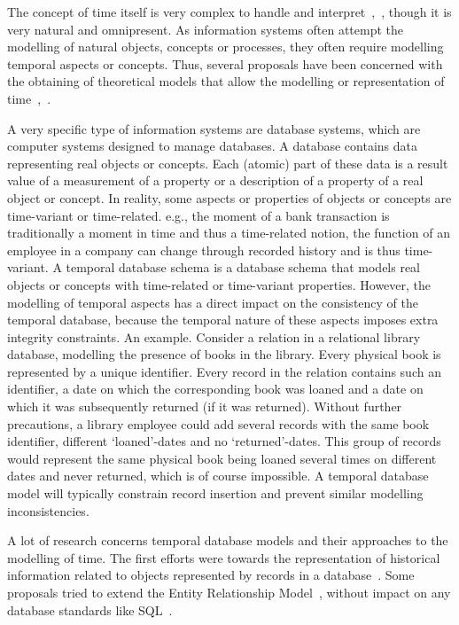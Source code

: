 %
%

The concept of time itself is very complex to handle and interpret~\cite{klein94},~\cite{Shackle61}, though it is very natural and omnipresent. As information systems often attempt the modelling of natural objects, concepts or processes, they often require modelling temporal aspects or concepts. Thus, several proposals have been concerned with the obtaining of theoretical models that allow the modelling or representation of time~\cite{Bolour82},~\cite{Cru97}.

A very specific type of information systems are database systems, which are computer systems designed to manage databases. A database contains data representing real objects or concepts. Each (atomic) part of these data is a result value of a measurement of a property or a description of a property of a real object or concept. In reality, some aspects or properties of objects or concepts are time-variant or time-related. e.g., the moment of a bank transaction is traditionally a moment in time and thus a time-related notion, the function of an employee in a company can change through recorded history and is thus time-variant. A temporal database schema is a database schema that models real objects or concepts with time-related or time-variant properties. However, the modelling of temporal aspects has a direct impact on the consistency of the temporal database, because the temporal nature of these aspects imposes extra integrity constraints. An example. Consider a relation in a relational library database, modelling the presence of books in the library. Every physical book is represented by a unique identifier. Every record in the relation contains such an identifier, a date on which the corresponding book was loaned and a date on which it was subsequently returned (if it was returned). Without further precautions, a library employee could add several records with the same book identifier, different `loaned'-dates and no `returned'-dates. This group of records would represent the same physical book being loaned several times on different dates and never returned, which is of course impossible. A temporal database model will typically constrain record insertion and prevent similar modelling inconsistencies.

A lot of research concerns temporal database models and their approaches to the modelling of time. The first efforts were towards the representation of historical information related to objects represented by records in a database~\cite{Clifford:1985:AHR:971699.318922}. Some proposals tried to extend the Entity Relationship Model~\cite{Klopprogge:1983}, without impact on any database standards like SQL~\cite{Sarda:1990:ESH:627277.627409}.

